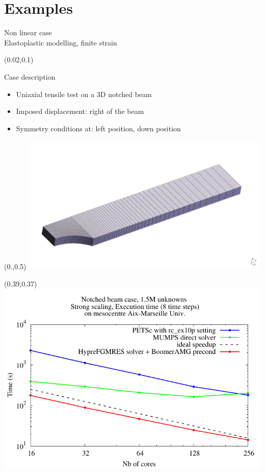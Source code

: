 \documentclass{beamer}
\begin{document}
\section{Examples}

\begin{frame}{Non linear case \\\hspace*{1cm} Elastoplastic modelling, finite strain}
\begin{textblock}{.9}(0.02,0.1)
  \begin{block}{Case description}
    \begin{itemize}
      \item Uniaxial tensile test on a 3D notched beam
      \item Imposed displacement: right of the beam
      \item Symmetry conditions at: left position, down position 
    \end{itemize}
  \end{block}
\end{textblock}
\begin{textblock}{.4}(0.,0.5)
\includegraphics[width=0.9\textwidth]{img/ssna303-geom.png}\\
\hspace*{3mm}{\footnotesize Geometry of the notched beam}
\end{textblock}
\begin{textblock}{.61}(0.39,0.37)
\includegraphics[trim = .1cm .1cm .1cm .1cm,clip,width=\textwidth]{bench/scal_ssna303.pdf}
\end{textblock}
\end{frame}
\end{document}
